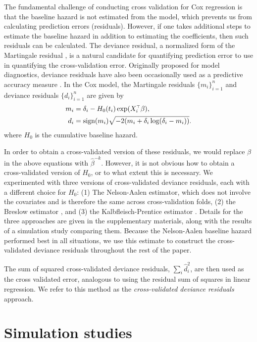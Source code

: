 The fundamental challenge of conducting cross validation for Cox regression is that the baseline hazard is not estimated from the model, which prevents us from calculating prediction errors (residuals).  However, if one takes additional steps to estimate the baseline hazard in addition to estimating the coefficients, then such residuals can be calculated.  The deviance residual, a normalized form of the Martingale residual \citep{Therneau1990}, is a natural candidate for quantifying prediction error to use in quantifying the cross-validation error.   Originally proposed for model diagnostics, deviance residuals have also been occasionally used as a predictive accuracy measure \citep{Therneau2018}.  In the Cox model, the Martingale residuals $\{m_i\}_{i=1}^n$ and deviance residuals $\{d_i\}_{i=1}^n$ are given by
\begin{align}
  \label{eq:res-m}
  m_{i} &= \delta_{i} - H_{0}(t_{i})\exp(X_i^{\scriptscriptstyle\top}\beta), \\
  \label{eq:res-d}
  d_{i} &= \text{sign}(m_{i})\sqrt{-2(m_i + \delta_{i}\log(\delta_{i} - m_i))}.  
\end{align}
where $H_0$ is the cumulative baseline hazard.

In order to obtain a cross-validated version of these residuals, we would replace $\beta$ in the above equations with $\hat{\beta}^{-k}$.  However, it is not obvious how to obtain a cross-validated version of $H_0$, or to what extent this is necessary.  We experimented with three versions of cross-validated deviance residuals, each with a different choice for $H_0$: (1) The Nelson-Aalen estimator, which does not involve the covariates and is therefore the same across cross-validation folds, (2) the Breslow estimator \citep{Breslow1972}, and (3) the Kalbfleisch-Prentice estimator \citep{Kalbfleisch2011}.  Details for the three approaches are given in the supplementary materials, along with the results of a simulation study comparing them.  Because the Nelson-Aalen baseline hazard performed best in all situations, we use this estimate to construct the cross-validated deviance residuals throughout the rest of the paper.

The sum of squared cross-validated deviance residuals, $\sum_{i}\hat{d}_{i}^2$, are then used as the cross validated error, analogous to using the residual sum of squares in linear regression. We refer to this method as the \emph{cross-validated deviance residuals} approach.

\section{Simulation studies}

